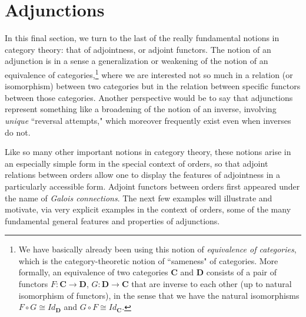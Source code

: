 \documentclass[a4paper]{book}
\theoremstyle{definition}
\theoremstyle{definition}
\theoremstyle{definition}
\theoremstyle{theorem}
\theoremstyle{definition}
\begin{document}
\section{Adjunctions}
In this final section, we turn to the last of the really fundamental notions in category theory: that of adjointness, or adjoint functors.  The notion of an adjunction is in a sense a generalization or weakening of the notion of an equivalence of categories,\footnote{We have basically already been using this notion of \textit{equivalence of categories}, which is the category-theoretic notion of ``sameness" of categories. More formally, an equivalence of two categories $\textbf{C}$ and $\textbf{D}$ consists of a pair of functors $F: \textbf{C} \rightarrow \textbf{D}$, $G: \textbf{D} \rightarrow \textbf{C}$ that are inverse to each other (up to natural isomorphism of functors), in the sense that we have the natural isomorphisms $F \circ G \cong Id_{\textbf{D}}$ and $G \circ F \cong Id_{\textbf{C}}$.} where we are interested not so much in a relation (or isomorphism) between two categories but in the relation between specific functors between those categories. Another perspective would be to say that adjunctions represent something like a broadening of the notion of an inverse, involving \textit{unique} ``reversal attempts," which moreover frequently exist even when inverses do not.  \par 
Like so many other important notions in category theory, these notions arise in an especially simple form in the special context of orders, so that adjoint relations between orders allow one to display the features of adjointness in a particularly accessible form. Adjoint functors between orders first appeared under the name of \textit{Galois connections}. The next few examples will illustrate and motivate, via very explicit examples in the context of orders, some of the many fundamental general features and properties of adjunctions. 
\end{document}
